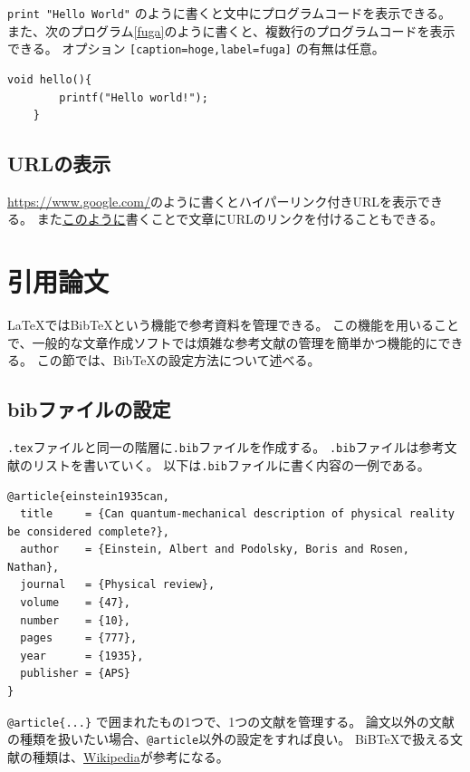 \documentclass[uplatex, a4paper,twocolumn, 14pt]{jsarticle}
\begin{document}
\lstinline{print "Hello World"} のように書くと文中にプログラムコードを表示できる。
また、次のプログラム\ref{fuga}のように書くと、複数行のプログラムコードを表示できる。
オプション \lstinline{[caption=hoge,label=fuga]} の有無は任意。

\begin{lstlisting}[caption=hoge,label=fuga]
    void hello(){
        printf("Hello world!");
    }
\end{lstlisting}

\subsection{URLの表示}
\url{https://www.google.com/}のように書くとハイパーリンク付きURLを表示できる。
また\href{https://www.bing.com/}{このように}書くことで文章にURLのリンクを付けることもできる。

\section{引用論文}

\LaTeX ではBibTeXという機能で参考資料を管理できる。
この機能を用いることで、一般的な文章作成ソフトでは煩雑な参考文献の管理を簡単かつ機能的にできる。
この節では、BibTeXの設定方法について述べる。

\subsection{bibファイルの設定}
\lstinline{.tex}ファイルと同一の階層に\lstinline{.bib}ファイルを作成する。
\lstinline{.bib}ファイルは参考文献のリストを書いていく。
以下は\lstinline{.bib}ファイルに書く内容の一例である。

\begin{lstlisting}
@article{einstein1935can,
  title     = {Can quantum-mechanical description of physical reality be considered complete?},
  author    = {Einstein, Albert and Podolsky, Boris and Rosen, Nathan},
  journal   = {Physical review},
  volume    = {47},
  number    = {10},
  pages     = {777},
  year      = {1935},
  publisher = {APS}
}
\end{lstlisting}

\verb+@article{...}+ で囲まれたもの1つで、1つの文献を管理する。
論文以外の文献の種類を扱いたい場合、\lstinline{@article}以外の設定をすれば良い。
BiBTeXで扱える文献の種類は、\href{https://ja.wikipedia.org/wiki/BibTeX#%E3%82%A8%E3%83%B3%E3%83%88%E3%83%AA%E7%A8%AE%E5%88%A5}{Wikipedia}が参考になる。
\end{document}
